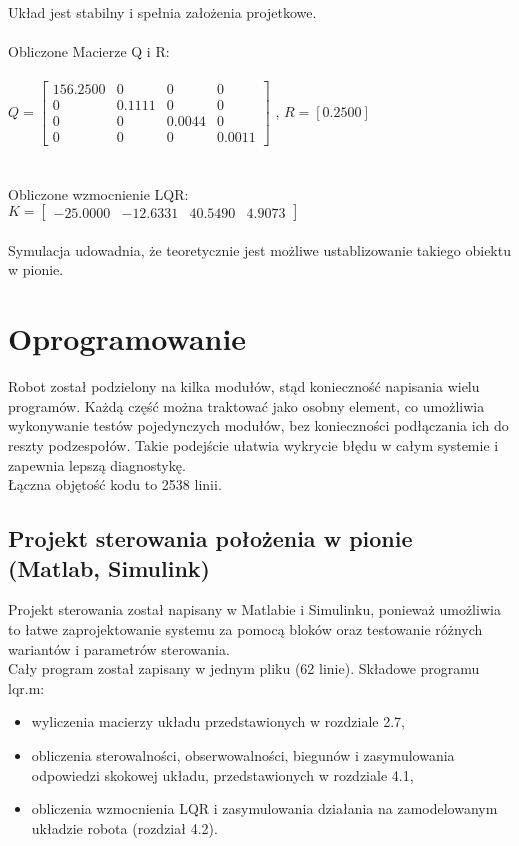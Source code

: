 \documentclass[a4paper,12pt,twoside,openany]{report}
\begin{document}
\noindent Układ jest stabilny i spełnia założenia projetkowe.\\
\\
\noindent Obliczone Macierze Q i R:\\
\\
$Q=\begin{bmatrix}
       156.2500 & 0 & 0 & 0          \\
       0 & 0.1111 & 0 & 0 \\
       0 & 0 & 0.0044 & 0 \\
       0 & 0 & 0 & 0.0011 
     \end{bmatrix}
$
, $R = [0.2500]$ \\
\\
\\
\noindent Obliczone wzmocnienie LQR:\\

$K=\begin{bmatrix}
       -25.0000 & -12.6331 & 40.5490 & 4.9073
     \end{bmatrix}
$
\\
\\
\noindent Symulacja udowadnia, że teoretycznie jest możliwe ustablizowanie takiego obiektu w pionie.

\chapter{Oprogramowanie}

Robot został podzielony na kilka modułów, stąd konieczność napisania wielu programów. Każdą część można traktować jako osobny element, co umożliwia wykonywanie testów pojedynczych modułów, bez konieczności podłączania ich do reszty podzespołów. Takie podejście ułatwia wykrycie błędu w całym systemie i zapewnia lepszą diagnostykę.\\
Łączna objętość kodu to 2538 linii.

\section{Projekt sterowania położenia w pionie (Matlab, Simulink)}

Projekt sterowania został napisany w Matlabie i Simulinku, ponieważ umożliwia to łatwe zaprojektowanie systemu za pomocą bloków oraz testowanie różnych wariantów i parametrów sterowania. \\
Cały program został zapisany w jednym pliku (62 linie). Składowe programu lqr.m:
\begin{itemize}
\item wyliczenia macierzy układu przedstawionych w rozdziale 2.7,
\item obliczenia sterowalności, obserwowalności, biegunów i zasymulowania odpowiedzi skokowej układu, przedstawionych w rozdziale 4.1,
\item obliczenia wzmocnienia LQR i zasymulowania działania na zamodelowanym układzie robota (rozdział 4.2).
\end{itemize}
\end{document}
